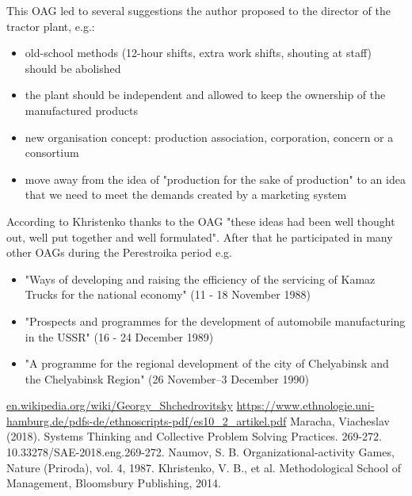 \documentclass[a4paper,11pt]{article}
\begin{document}
This OAG led to several suggestions the author proposed to the director of the tractor
plant, e.g.:
\begin{itemize}
\item old-school methods (12-hour shifts, extra work shifts, shouting at
  staff) should be abolished
\item the plant should be independent and allowed to keep the ownership of the
  manufactured products
\item new organisation concept: production association, corporation, concern
  or a consortium
\item move away from the idea of "production for the sake of production" to an
  idea that we need to meet the demands created by a marketing system
\end{itemize}
According to Khristenko thanks to the OAG "these ideas had been well thought
out, well put together and well formulated". After that he participated in
many other OAGs during the Perestroika period e.g.
\begin{itemize}
\item "Ways of developing and raising the efficiency of the servicing of Kamaz
  Trucks for the national economy" (11 - 18 November 1988)
\item "Prospects and programmes for the development of automobile
  manufacturing in the USSR" (16 - 24 December 1989)
\item "A programme for the regional development of the city of Chelyabinsk and
  the Chelyabinsk Region" (26 November–3 December 1990)
\end{itemize}
	
\begin{thebibliography}{99}
 \url{en.wikipedia.org/wiki/Georgy_Shchedrovitsky}
 \url{https://www.ethnologie.uni-hamburg.de/pdfs-de/ethnoscripts-pdf/es10_2_artikel.pdf}
 Maracha, Viacheslav (2018). Systems Thinking and Collective
  Problem Solving Practices. 269-272. 10.33278/SAE-2018.eng.269-272.
 Naumov, S. B. Organizational-activity Games, Nature (Priroda),
  vol. 4, 1987.
  Khristenko, V. B., et al. Methodological School of Management,
   Bloomsbury Publishing, 2014. 
\end{thebibliography}
\end{document}
